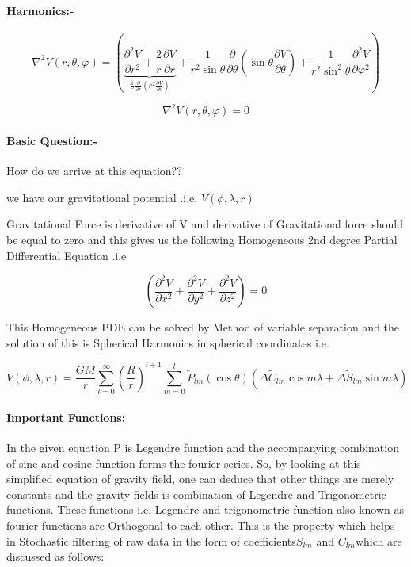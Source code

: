 \documentclass[a4paper,12pt]{article}
\begin{document}
\paragraph{Harmonics:-} 
 
\begin {equation}
\nabla ^2V(r,\theta ,\varphi) = \left( {\underbrace {\frac{\partial ^2V }{\partial r^2} +
\frac{2}{r}\frac{\partial V }{\partial
r}}_{\frac{1}{^{r^2}}\frac{\partial }{\partial r}\left( {r^2\frac{\partial
V }{\partial r}} \right)} + \frac{1}{r^2\sin \theta }\frac{\partial
}{\partial \theta }\left( {\sin \theta \frac{\partial V }{\partial \theta
}} \right) + \frac{1}{r^2\sin ^2\theta }\frac{\partial ^2V }{\partial
\varphi ^2}} \right)
\end{equation}

\begin {equation}
\nabla ^2V(r,\theta ,\varphi) = 0
\end{equation}

\paragraph{Basic Question:-} How do we arrive at this equation??

we have our gravitational potential .i.e. $V(\phi,\lambda,r)$

Gravitational Force is derivative of V and derivative of Gravitational force should be equal to zero and this gives us the following Homogeneous 2nd degree Partial Differential Equation .i.e

   \[ \left( \frac{\partial^2 V}{\partial x^2}
      + \frac{\partial^2 V}{\partial y^2}
      + \frac{\partial^2 V}{\partial z^2} \right)=0 \]

This Homogeneous PDE  can be solved by Method of variable separation and the solution of this is Spherical Harmonics in spherical coordinates i.e.

\begin{equation}
V(\phi,\lambda,r)=\frac{GM}{r}\sum_{l=0}^{\infty} \left(\frac{R}{r}\right)^{l+1}\sum_{m=0}^{l} \widetilde{P}_{lm}(\cos\theta)(\Delta\widetilde{C}_{lm}\cos m\lambda + \Delta\widetilde{S}_{lm}\sin m\lambda)
\end{equation}

\paragraph{Important Functions:} 
In the given equation P is Legendre function and the accompanying combination of sine and cosine function forms the fourier series. So, by looking at this simplified equation of gravity field, one can deduce that other things are merely constants and the gravity fields is combination of Legendre and Trigonometric functions.
These functions i.e. Legendre and trigonometric function also known as fourier functions are Orthogonal to each other. This is the property which helps in Stochastic filtering of raw data in the form of coefficients$ S_{lm}$ and $C_{lm} $which are discussed as follows:  
\end{document}
